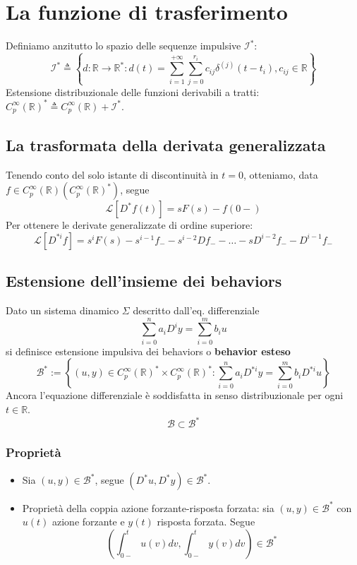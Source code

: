 \documentclass[11pt]{article}
\begin{document}
\section{La funzione di trasferimento}
Definiamo anzitutto lo spazio delle sequenze impulsive $\mathcal{I}^*$:
\begin{displaymath}
    \mathcal{I}^* \triangleq \left\{d:\mathbb{R}\rightarrow\mathbb{R}^*:d(t) = \sum_{i=1}^{+\infty}\sum_{j=0}^{r_i} c_{ij}\delta^{(j)}(t-t_i), c_{ij} \in \mathbb{R}\right\}
\end{displaymath}
Estensione distribuzionale delle funzioni derivabili a tratti: $C_p^\infty (\mathbb{R})^* \triangleq C_p^\infty (\mathbb{R}) + \mathcal{I}^*$.
\subsection{La trasformata della derivata generalizzata}
Tenendo conto del solo istante di discontinuità in $t=0$, otteniamo, data $f \in C_p^{\infty} (\mathbb{R})(C_p^\infty(\mathbb{R})^*)$, segue
\begin{displaymath}
    \mathcal{L}[D^*f(t)] = sF(s) - f(0-)
\end{displaymath}
Per ottenere le derivate generalizzate di ordine superiore:
\begin{displaymath}
    \mathcal{L}[D^{*i}f] = s^i F(s) - s^{i-1}f_- - s^{i-2} Df_- -\dots-sD^{i-2}f_--D^{i-1}f_-
\end{displaymath}
\subsection{Estensione dell'insieme dei behaviors}
Dato un sistema dinamico $\Sigma$ descritto dall'eq. differenziale
\begin{displaymath}
    \sum_{i=0}^n a_i D^i  y = \sum_{i=0}^m b_i u
\end{displaymath}
si definisce estensione impulsiva dei behaviors o \textbf{behavior esteso}
\begin{displaymath}
    \mathcal{B}^* := \left\{(u,y) \in C_p^\infty (\mathbb{R})^* \times C_p^\infty (\mathbb{R})^* : \sum_{i=0}^n a_i D^{*i} y = \sum_{i=0}^m b_i D^{*i} u\right\}
\end{displaymath}
Ancora l'equazione differenziale è soddisfatta in senso distribuzionale per ogni $t \in \mathbb{R}$. 
\begin{displaymath}
    \mathcal{B} \subset \mathcal{B}^*
\end{displaymath}
\subsubsection{Proprietà}
\begin{itemize}
    \item Sia $(u,y)\in \mathcal{B}^*$, segue $(D^*u, D^*y)\in \mathcal{B}^*$.
    \item Proprietà della coppia azione forzante-risposta forzata: sia $(u,y) \in \mathcal{B}^*$ con $u(t)$ azione forzante e $y(t)$ risposta forzata. Segue 
    \begin{displaymath}
        \left(\int_{0-}^t u(v) dv,\int_{0-}^t y(v) dv\right) \in \mathcal{B}^*
    \end{displaymath}
\end{itemize}
\end{document}
